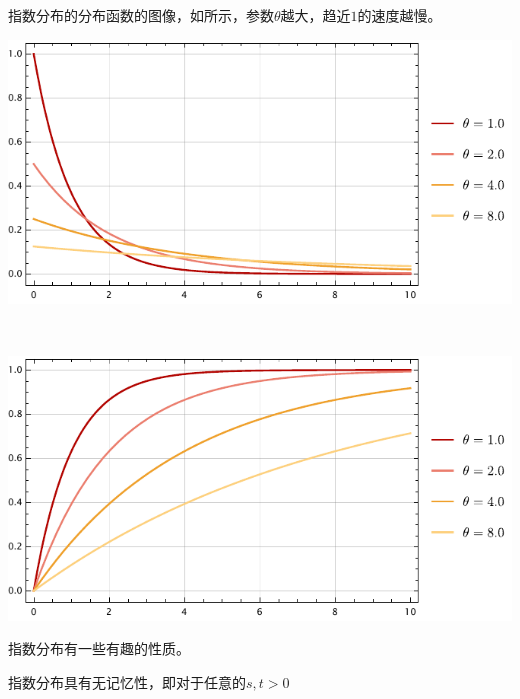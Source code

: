 指数分布的分布函数的图像，如所示，参数$\theta$越大，趋近$1$的速度越慢。

\begin{Figure}[指数分布]
    \begin{FigureSub}[指数分布的概率密度]
        \hspace{1cm}
        \includegraphics[scale=0.9]{Mathematica/output/ExpFunc.pdf}
    \end{FigureSub}\\ \vspace{0.5cm}
    \begin{FigureSub}[指数分布的分布函数]
        \hspace{1cm}
        \includegraphics[scale=0.9]{Mathematica/output/ExpFuncF.pdf}
    \end{FigureSub}
\end{Figure}
指数分布有一些有趣的性质。

\begin{BoxProperty}[指数分布的无记忆性]
    指数分布具有无记忆性，即对于任意的$s,t>0$
\end{BoxProperty}

